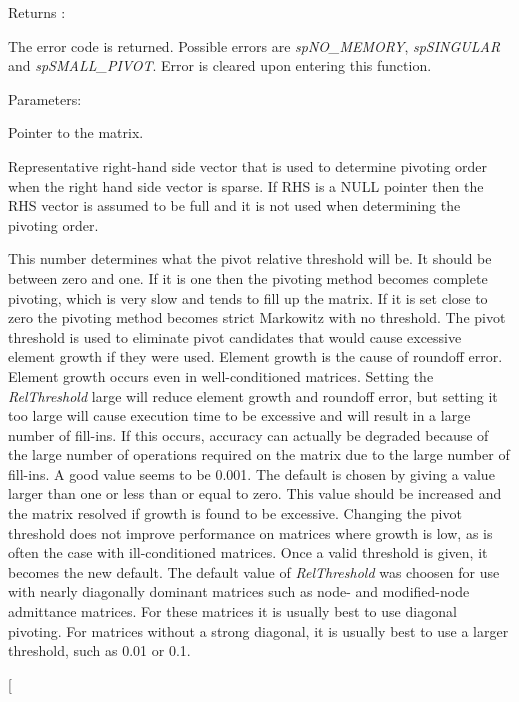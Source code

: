 \begin{Desc}
\item[Returns :]\par
 The error code is returned. Possible errors are {\em sp\-NO\_\-MEMORY},  {\em sp\-SINGULAR} and {\em sp\-SMALL\_\-PIVOT}. Error is cleared upon entering this function.\end{Desc}
\begin{Desc}
\item[Parameters: ]\par
\begin{description}
\item[{\em 
e\-Matrix}]Pointer to the matrix. \item[{\em 
RHS}]Representative right-hand side vector that is used to determine pivoting order when the right hand side vector is sparse. If RHS is a NULL pointer then the RHS vector is assumed to be full and it is not used when determining the pivoting order. \item[{\em 
Rel\-Threshold}]This number determines what the pivot relative threshold will be. It should be between zero and one. If it is one then the pivoting method becomes complete pivoting, which is very slow and tends to fill up the matrix. If it is set close to zero the pivoting method becomes strict Markowitz with no threshold. The pivot threshold is used to eliminate pivot candidates that would cause excessive element growth if they were used. Element growth is the cause of roundoff error. Element growth occurs even in well-conditioned matrices. Setting the {\em Rel\-Threshold} large will reduce element growth and roundoff error, but setting it too large will cause execution time to be excessive and will result in a large number of fill-ins. If this occurs, accuracy can actually be degraded because of the large number of operations required on the matrix due to the large number of fill-ins. A good value seems to be 0.001. The default is chosen by giving a value larger than one or less than or equal to zero. This value should be increased and the matrix resolved if growth is found to be excessive. Changing the pivot threshold does not improve performance on matrices where growth is low, as is often the case with ill-conditioned matrices. Once a valid threshold is given, it becomes the new default. The default value of {\em Rel\-Threshold} was choosen for use with nearly diagonally dominant matrices such as node- and modified-node admittance matrices. For these matrices it is usually best to use diagonal pivoting. For matrices without a strong diagonal, it is usually best to use a larger threshold, such as 0.01 or 0.1. \item[{\em 
}
\end{description}
\end{Desc}
